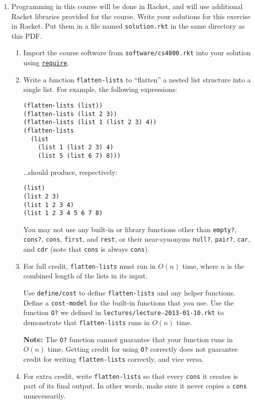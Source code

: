 \documentclass{article}
\begin{document}
\begin{enumerate}
\pagebreak[1]
\item
  Programming in this course will be done in Racket, and will use additional
  Racket libraries provided for the course.  Write your solutions for this
  exercise in Racket.  Put them in a file named \texttt{solution.rkt} in the
  same directory as this PDF.
  \begin{enumerate}
  \item
    Import the course software from \texttt{software/cs4800.rkt} into your
    solution using
    \href{http://docs.racket-lang.org/reference/require.html}{\texttt{require}}.
  \item
    Write a function \texttt{flatten-lists} to ``flatten'' a nested list
    structure into a single list.  For example, the following expressions:
    \begin{verbatim}
(flatten-lists (list))
(flatten-lists (list 2 3))
(flatten-lists (list 1 (list 2 3) 4))
(flatten-lists
  (list
    (list 1 (list 2 3) 4)
    (list 5 (list 6 7) 8))) \end{verbatim}
    \dots should produce, respectively:
    \begin{verbatim}
(list)
(list 2 3)
(list 1 2 3 4)
(list 1 2 3 4 5 6 7 8) \end{verbatim}
    You may not use any built-in or library functions other than
    \texttt{empty?}, \texttt{cons?}, \texttt{cons}, \texttt{first},
    and \texttt{rest}, or their near-synonyms \texttt{null?}, \texttt{pair?}, 
    \texttt{car}, and \texttt{cdr} (note that \texttt{cons} is always
    \texttt{cons}).
  \item
    For full credit, \texttt{flatten-lists} must run in \(O(n)\) time, where
    \(n\) is the combined length of the lists in its input.

    Use \texttt{define/cost} to define \texttt{flatten-lists} and any helper
    functions.  Define a \texttt{cost-model} for the built-in functions that you
    use.  Use the function \texttt{O?} we defined in
    \texttt{lectures/lecture-2013-01-10.rkt} to demonstrate that
    \texttt{flatten-lists} runs in \(O(n)\) time.

    \textbf{Note:} The \texttt{O?} function cannot guarantee that your function
    runs in \(O(n)\) time.  Getting credit for using \texttt{O?} correctly does
    not guarantee credit for writing \texttt{flatten-lists} correctly, and vice
    versa.
  \item
    For extra credit, write \texttt{flatten-lists} so that every \texttt{cons}
    it creates is part of its final output.  In other words, make sure it never
    copies a \texttt{cons} unnecessarily.
  \end{enumerate}


\end{enumerate}
\end{document}
